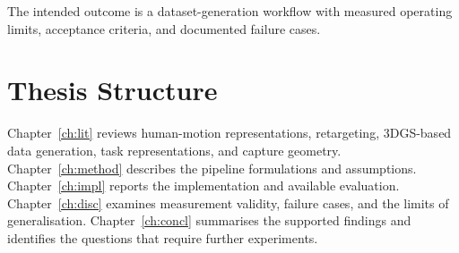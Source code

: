 The intended outcome is a dataset-generation workflow with measured operating
limits, acceptance criteria, and documented failure cases.

\section{Thesis Structure}
\label{sec:structure}

Chapter~\ref{ch:lit} reviews human-motion representations, retargeting,
3DGS-based data generation, task representations, and capture geometry.
Chapter~\ref{ch:method} describes the pipeline formulations and assumptions.
Chapter~\ref{ch:impl} reports the implementation and available evaluation.
Chapter~\ref{ch:disc} examines measurement validity, failure cases, and the
limits of generalisation. Chapter~\ref{ch:concl} summarises the supported
findings and identifies the questions that require further experiments.
